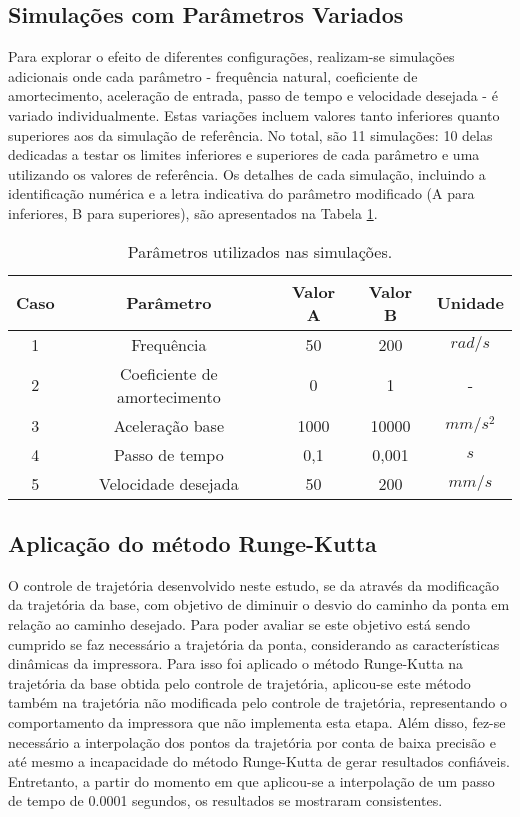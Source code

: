 \subsection{Simulações com Parâmetros Variados}
Para explorar o efeito de diferentes configurações, realizam-se simulações adicionais onde cada parâmetro - frequência natural, coeficiente de amortecimento, aceleração de entrada, passo de tempo e velocidade desejada - é variado individualmente. Estas variações incluem valores tanto inferiores quanto superiores aos da simulação de referência. No total, são 11 simulações: 10 delas dedicadas a testar os limites inferiores e superiores de cada parâmetro e uma utilizando os valores de referência. Os detalhes de cada simulação, incluindo a identificação numérica e a letra indicativa do parâmetro modificado (A para inferiores, B para superiores), são apresentados na Tabela \ref{tab:sim_params}.

\begin{table}
    \begin{center}
    \caption{Parâmetros utilizados nas simulações.}
    \label{tab:sim_params}
    \begin{tabular}{c c c c c}
        Caso & Parâmetro & Valor A & Valor B & Unidade\\ \hline
        1 & Frequência & 50 & 200 & $rad/s$\\
        2 & Coeficiente de amortecimento & 0 & 1 & - \\
        3 & Aceleração base & 1000 & 10000 & $mm/s^2$ \\
        4 & Passo de tempo & 0,1 & 0,001 & $s$ \\
        5 & Velocidade desejada & 50 & 200 & $mm/s$ \\ \hline
    \end{tabular}
    \end{center}
\end{table}

\subsection{Aplicação do método Runge-Kutta}
O controle de trajetória desenvolvido neste estudo, se da através da modificação da trajetória da base, com objetivo de diminuir o desvio do caminho da ponta em relação ao caminho desejado. Para poder avaliar se este objetivo está sendo cumprido se faz necessário a trajetória da ponta, considerando as características dinâmicas da impressora. Para isso foi aplicado o método Runge-Kutta na trajetória da base obtida pelo controle de trajetória, aplicou-se este método também na trajetória não modificada pelo controle de trajetória, representando o comportamento da impressora que não implementa esta etapa. Além disso, fez-se necessário a interpolação dos pontos da trajetória por conta de baixa precisão e até mesmo a incapacidade do método Runge-Kutta de gerar resultados confiáveis. Entretanto, a partir do momento em que aplicou-se a interpolação de um passo de tempo de 0.0001 segundos, os resultados se mostraram consistentes.

